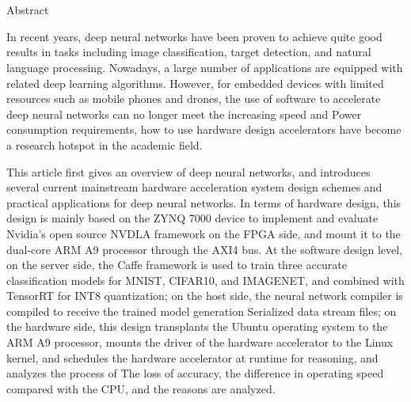\chapter[Abstract]{\MyTitleEn}

\begin{center}
\vspace{-0.3cm}
 \songti Abstract
\vspace{0.3cm}
\end{center}

In recent years, deep neural networks have been proven to achieve quite good results in tasks including image classification, target detection, and natural language processing. Nowadays, a large number of applications are equipped with related deep learning algorithms. However, for embedded devices with limited resources such as mobile phones and drones, the use of software to accelerate deep neural networks can no longer meet the increasing speed and Power consumption requirements, how to use hardware design accelerators have become a research hotspot in the academic field.

This article first gives an overview of deep neural networks, and introduces several current mainstream hardware acceleration system design schemes and practical applications for deep neural networks. In terms of hardware design, this design is mainly based on the ZYNQ 7000 device to implement and evaluate Nvidia's open source NVDLA framework on the FPGA side, and mount it to the dual-core ARM A9 processor through the AXI4 bus. At the software design level, on the server side, the Caffe framework is used to train three accurate classification models for MNIST, CIFAR10, and IMAGENET, and combined with TensorRT for INT8 quantization; on the host side, the neural network compiler is compiled to receive the trained model generation Serialized data stream files; on the hardware side, this design transplants the Ubuntu operating system to the ARM A9 processor, mounts the driver of the hardware accelerator to the Linux kernel, and schedules the hardware accelerator at runtime for reasoning, and analyzes the process of The loss of accuracy, the difference in operating speed compared with the CPU, and the reasons are analyzed.

